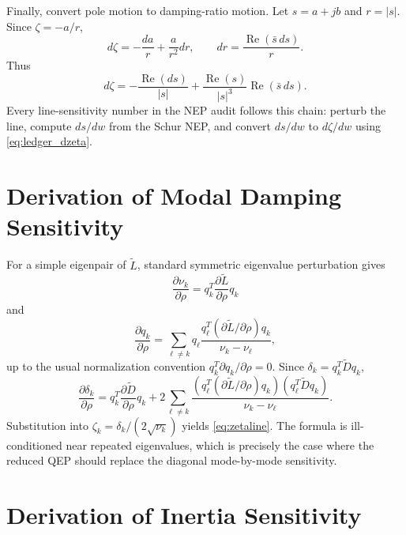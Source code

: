 \documentclass[journal]{IEEEtran}
\newcommand{\Lt}{\widetilde L}
\newcommand{\Dt}{\widetilde D}
\newcommand{\Real}{\operatorname{Re}}
\begin{document}
Finally, convert pole motion to damping-ratio motion. Let $s=a+jb$ and $r=|s|$. Since $\zeta=-a/r$,
\begin{equation}
d\zeta
=-\frac{d a}{r}+\frac{a}{r^2}dr,
\qquad
dr=\frac{\Real(\bar{s}\,ds)}{r}.
\end{equation}
Thus
\begin{equation}
d\zeta=
-\frac{\Real(ds)}{|s|}
+\frac{\Real(s)}{|s|^3}\Real(\bar{s}\,ds).
\label{eq:ledger_dzeta}
\end{equation}
Every line-sensitivity number in the NEP audit follows this chain: perturb the line, compute $ds/dw$ from the Schur NEP, and convert $ds/dw$ to $d\zeta/dw$ using \eqref{eq:ledger_dzeta}.

\section{Derivation of Modal Damping Sensitivity}

For a simple eigenpair of $\Lt$, standard symmetric eigenvalue perturbation gives
\begin{equation}
\frac{\partial \nu_k}{\partial\rho}=q_k^T\frac{\partial\Lt}{\partial\rho}q_k
\end{equation}
and
\begin{equation}
\frac{\partial q_k}{\partial\rho}=
\sum_{\ell\neq k}q_\ell
\frac{q_\ell^T(\partial\Lt/\partial\rho)q_k}{\nu_k-\nu_\ell},
\end{equation}
up to the usual normalization convention $q_k^T\partial q_k/\partial\rho=0$. Since $\delta_k=q_k^T\Dt q_k$,
\begin{equation}
\frac{\partial\delta_k}{\partial\rho}
=q_k^T\frac{\partial\Dt}{\partial\rho}q_k
+2\sum_{\ell\neq k}
\frac{(q_\ell^T(\partial\Lt/\partial\rho)q_k)(q_\ell^T\Dt q_k)}
{\nu_k-\nu_\ell}.
\end{equation}
Substitution into $\zeta_k=\delta_k/(2\sqrt{\nu_k})$ yields \eqref{eq:zetaline}. The formula is ill-conditioned near repeated eigenvalues, which is precisely the case where the reduced QEP should replace the diagonal mode-by-mode sensitivity.

\section{Derivation of Inertia Sensitivity}
\end{document}
